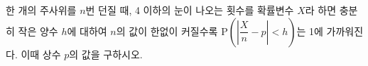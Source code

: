 한 개의 주사위를 $n$번 던질 때, 4 이하의 눈이 나오는 횟수를 확률변수 $X$라 하면 충분히 작은 양수 $h$에 대하여 $n$의 값이 한없이 커질수록 $\mathrm{P}\left(\left|\dfrac{X}{n}-p\right|<h\right)$는 1에 가까워진다. 이때 상수 $p$의 값을 구하시오.
